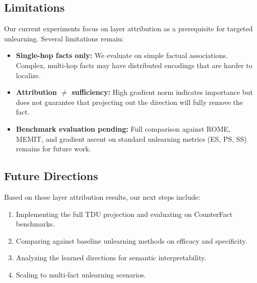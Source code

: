 \subsection{Limitations}
\label{sec:limitations}

Our current experiments focus on layer attribution as a prerequisite for targeted unlearning. Several limitations remain:

\begin{itemize}
    \item \textbf{Single-hop facts only:} We evaluate on simple factual associations. Complex, multi-hop facts may have distributed encodings that are harder to localize.
    
    \item \textbf{Attribution $\neq$ sufficiency:} High gradient norm indicates importance but does not guarantee that projecting out the direction will fully remove the fact.
    
    \item \textbf{Benchmark evaluation pending:} Full comparison against ROME, MEMIT, and gradient ascent on standard unlearning metrics (ES, PS, SS) remains for future work.
\end{itemize}

\subsection{Future Directions}

Based on these layer attribution results, our next steps include:
\begin{enumerate}
    \item Implementing the full TDU projection and evaluating on CounterFact benchmarks.
    \item Comparing against baseline unlearning methods on efficacy and specificity.
    \item Analyzing the learned directions for semantic interpretability.
    \item Scaling to multi-fact unlearning scenarios.
\end{enumerate}
